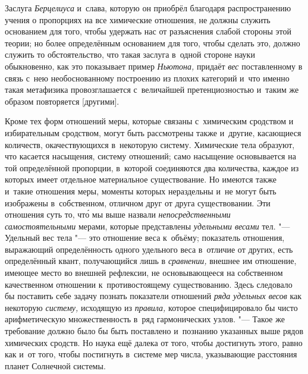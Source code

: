 Заслуга {\em Берцелиуса} и~слава, которую он приобрёл благодаря распространению учения о
пропорциях на все химические отношения, не должны служить основанием для того,
чтобы удержать нас от разъяснения слабой стороны этой теории; но более
определённым основанием для того, чтобы сделать это, должно служить то
обстоятельство, что такая заслуга в~одной стороне науки обыкновенно, как это
показывает пример {\em Ньютона,} придаёт {\em вес} поставленному в
связь с~нею необоснованному построению из плохих категорий и~что именно такая
метафизика провозглашается с~величайшей претенциозностью и~таким же образом
повторяется [другими].

Кроме тех форм отношений меры, которые связаны с~химическим сродством и
избирательным сродством, могут быть рассмотрены также и~другие, касающиеся
количеств, окачествующихся в~некоторую систему. Химические тела образуют, что
касается насыщения, систему отношений; само насыщение основывается на той определённой
пропорции, в~которой соединяются два количества, каждое из которых
имеет отдельное материальное существование. Но
имеются также и~такие отношения меры, моменты которых нераздельны и~не могут
быть изображены в~собственном, отличном друг от друга существовании. Эти
отношения суть то, чт\'{о} мы выше назвали
{\em непосредственными самостоятельными} мерами, которые представлены
{\em удельными весами} тел. "--- Удельный вес тела "--- это отношение
веса к~объёму; показатель отношения, выражающий определённость одного удельного
веса в~отличие от других, есть определённый квант, получающийся лишь
в {\em сравнении,} внешнее им отношение, имеющее место во внешней рефлексии,
не основывающееся на собственном качественном отношении к~противостоящему
существованию. Здесь следовало бы поставить себе задачу познать показатели
отношений {\em ряда удельных весов} как некоторую {\em систему,} исходящую
из {\em правила,} которое специфицировало бы чисто арифметическую
множественность в~ряд гармонических узлов. "--- Такое же требование должно было
бы быть поставлено и~познанию указанных выше рядов химических сродств. Но наука
ещё далека от того, чтобы достигнуть этого, равно как и~от того, чтобы
постигнуть в~системе мер числа, указывающие расстояния планет Солнечной
системы.

